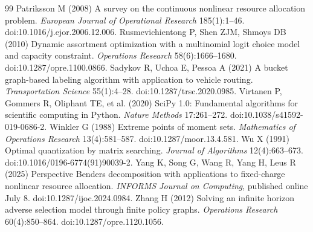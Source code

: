 \documentclass[11pt,letterpaper]{article}
\theoremstyle{definition}\newtheorem{remark}[theorem]{Remark}
\begin{document}
\begin{thebibliography}{99}
Patriksson M (2008) A survey on the continuous nonlinear resource allocation problem. \emph{European Journal of Operational Research} 185(1):1--46. doi:10.1016/j.ejor.2006.12.006.
Rusmevichientong P, Shen ZJM, Shmoys DB (2010) Dynamic assortment optimization with a multinomial logit choice model and capacity constraint. \emph{Operations Research} 58(6):1666--1680. doi:10.1287/opre.1100.0866.
Sadykov R, Uchoa E, Pessoa A (2021) A bucket graph-based labeling algorithm with application to vehicle routing. \emph{Transportation Science} 55(1):4--28. doi:10.1287/trsc.2020.0985.
Virtanen P, Gommers R, Oliphant TE, et al. (2020) SciPy 1.0: Fundamental algorithms for scientific computing in Python. \emph{Nature Methods} 17:261--272. doi:10.1038/s41592-019-0686-2.
Winkler G (1988) Extreme points of moment sets. \emph{Mathematics of Operations Research} 13(4):581--587. doi:10.1287/moor.13.4.581.
Wu X (1991) Optimal quantization by matrix searching. \emph{Journal of Algorithms} 12(4):663--673. doi:10.1016/0196-6774(91)90039-2.
Yang K, Song G, Wang R, Yang H, Leus R (2025) Perspective Benders decomposition with applications to fixed-charge nonlinear resource allocation. \emph{INFORMS Journal on Computing}, published online July 8. doi:10.1287/ijoc.2024.0984.
Zhang H (2012) Solving an infinite horizon adverse selection model through finite policy graphs. \emph{Operations Research} 60(4):850--864. doi:10.1287/opre.1120.1056.


\end{thebibliography}
\clearpage
\end{document}
